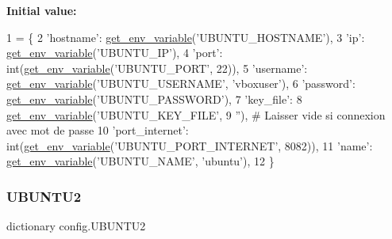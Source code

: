 {\bfseries Initial value\+:}
\begin{DoxyCode}
1 =  \{
2     \textcolor{stringliteral}{'hostname'}: \hyperlink{namespaceconfig_a7cf1bd9315cd5f3237441a2d9414082d}{get\_env\_variable}(\textcolor{stringliteral}{'UBUNTU\_HOSTNAME'}),
3     \textcolor{stringliteral}{'ip'}: \hyperlink{namespaceconfig_a7cf1bd9315cd5f3237441a2d9414082d}{get\_env\_variable}(\textcolor{stringliteral}{'UBUNTU\_IP'}),
4     \textcolor{stringliteral}{'port'}: int(\hyperlink{namespaceconfig_a7cf1bd9315cd5f3237441a2d9414082d}{get\_env\_variable}(\textcolor{stringliteral}{'UBUNTU\_PORT'}, 22)),
5     \textcolor{stringliteral}{'username'}: \hyperlink{namespaceconfig_a7cf1bd9315cd5f3237441a2d9414082d}{get\_env\_variable}(\textcolor{stringliteral}{'UBUNTU\_USERNAME'}, \textcolor{stringliteral}{'vboxuser'}),
6     \textcolor{stringliteral}{'password'}: \hyperlink{namespaceconfig_a7cf1bd9315cd5f3237441a2d9414082d}{get\_env\_variable}(\textcolor{stringliteral}{'UBUNTU\_PASSWORD'}),
7     \textcolor{stringliteral}{'key\_file'}:
8     \hyperlink{namespaceconfig_a7cf1bd9315cd5f3237441a2d9414082d}{get\_env\_variable}(\textcolor{stringliteral}{'UBUNTU\_KEY\_FILE'},
9                      \textcolor{stringliteral}{''}),  \textcolor{comment}{# Laisser vide si connexion avec mot de passe}
10     \textcolor{stringliteral}{'port\_internet'}: int(\hyperlink{namespaceconfig_a7cf1bd9315cd5f3237441a2d9414082d}{get\_env\_variable}(\textcolor{stringliteral}{'UBUNTU\_PORT\_INTERNET'}, 8082)),
11     \textcolor{stringliteral}{'name'}: \hyperlink{namespaceconfig_a7cf1bd9315cd5f3237441a2d9414082d}{get\_env\_variable}(\textcolor{stringliteral}{'UBUNTU\_NAME'}, \textcolor{stringliteral}{'ubuntu'}),
12 \}
\end{DoxyCode}
\mbox{\label{namespaceconfig_a6579f0a8b9b00feef5c78067411e8666}} 
\subsubsection{\texorpdfstring{U\+B\+U\+N\+T\+U2}{UBUNTU2}}
{\footnotesize\ttfamily dictionary config.\+U\+B\+U\+N\+T\+U2}

